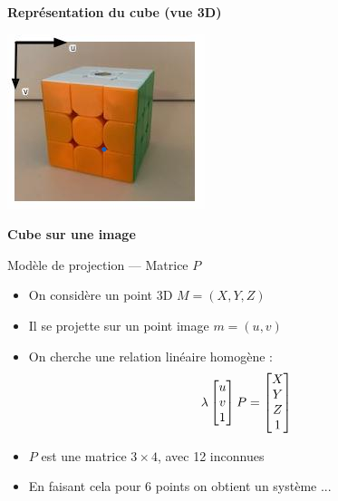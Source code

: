 \begin{frame}
\begin{minipage}{0.48\textwidth}
    {\footnotesize\textbf{Représentation du cube (vue 3D)}}
\end{minipage}
\hfill
\begin{minipage}{0.48\textwidth}
    \centering
    \includegraphics[width=\linewidth]{capture/cube_repere.png}
    \vspace{0.5em}

    {\footnotesize\textbf{Cube sur une image}}
\end{minipage}

\end{frame}

\begin{frame}{Modèle de projection — Matrice \( P \)}

\begin{itemize}
  \item<1-> On considère un point 3D \( M = (X, Y, Z) \)
  \item<2-> Il se projette sur un point image \( m = (u, v) \)
  \hyperlink{projection-appendix}{
  }
  \item<3-> On cherche une relation linéaire homogène :
  \[
  \lambda
  \begin{bmatrix}
  u \cr v \cr 1
  \end{bmatrix}
  P
  =
  \begin{bmatrix}
  X \cr Y \cr Z \cr 1
  \end{bmatrix}
  \]

  \item<4-> \( P \) est une matrice \( 3 \times 4 \), avec 12 inconnues
  \item<5-> En faisant cela pour 6 points on obtient un système ...
\end{itemize}
\end{frame}

